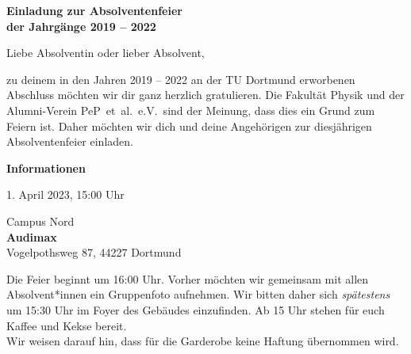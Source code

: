\documentclass[parskip=half, fontsize=10pt, paper=a5]{scrartcl}
\begin{document}
\raggedright


\begin{center}
\textbf{\Large Einladung zur Absolventenfeier\\ der Jahrgänge 2019 – 2022}
\end{center}
\vspace{0.5cm}

Liebe Absolventin oder lieber Absolvent,

zu deinem in den Jahren 2019 – 2022 an der TU Dortmund erworbenen Abschluss möchten
wir dir ganz herzlich gratulieren.
Die Fakultät Physik und der Alumni-Verein PeP~et~al.~e.V.\ sind der Meinung, dass dies ein Grund zum Feiern ist.
Daher möchten wir dich und deine Angehörigen zur diesjährigen Absolventenfeier einladen.

\vspace{0.25cm}
\textcolor{tu}{\textbf{\large Informationen}}
\begin{description}[style=multiline, leftmargin=5em]
  \item[Wann] 1. April 2023, 15:00 Uhr
  \item[Wo] Campus Nord\\
    \textbf{Audimax}\\
    Vogelpothsweg 87, 44227 Dortmund
\end{description}

\vspace{0.25cm}



Die Feier beginnt um 16:00 Uhr. Vorher möchten wir gemeinsam mit allen Absolvent*innen ein Gruppenfoto aufnehmen.
Wir bitten daher sich \emph{spätestens} um 15:30 Uhr im Foyer des Gebäudes einzufinden.
Ab 15 Uhr stehen für euch Kaffee und Kekse bereit. \\
Wir weisen darauf hin, dass für die Garderobe keine Haftung übernommen wird.
\end{document}
